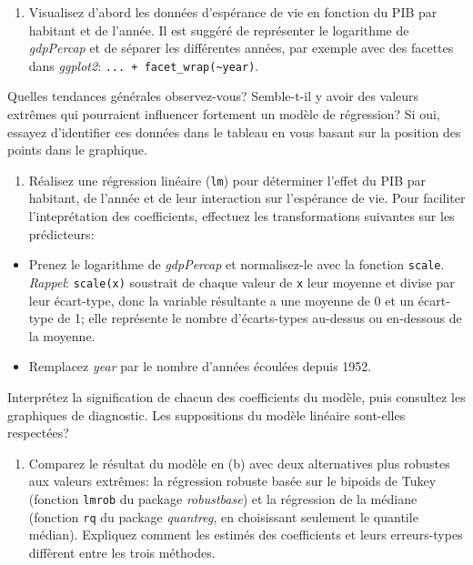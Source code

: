 \documentclass[
]{article}
\providecommand{\tightlist}{%
  \setlength{\itemsep}{0pt}\setlength{\parskip}{0pt}}
\begin{document}
\begin{enumerate}
\def\labelenumi{\alph{enumi})}
\tightlist
\item
  Visualisez d'abord les données d'espérance de vie en fonction du PIB
  par habitant et de l'année. Il est suggéré de représenter le
  logarithme de \emph{gdpPercap} et de séparer les différentes années,
  par exemple avec des facettes dans \emph{ggplot2}:
  \texttt{...\ +\ facet\_wrap(\textasciitilde{}year)}.
\end{enumerate}

Quelles tendances générales observez-vous? Semble-t-il y avoir des
valeurs extrêmes qui pourraient influencer fortement un modèle de
régression? Si oui, essayez d'identifier ces données dans le tableau en
vous basant sur la position des points dans le graphique.

\begin{enumerate}
\def\labelenumi{\alph{enumi})}
\setcounter{enumi}{1}
\tightlist
\item
  Réalisez une régression linéaire (\texttt{lm}) pour déterminer l'effet
  du PIB par habitant, de l'année et de leur interaction sur l'espérance
  de vie. Pour faciliter l'inteprétation des coefficients, effectuez les
  transformations suivantes sur les prédicteurs:
\end{enumerate}

\begin{itemize}
\item
  Prenez le logarithme de \emph{gdpPercap} et normalisez-le avec la
  fonction \texttt{scale}. \emph{Rappel}: \texttt{scale(x)} soustrait de
  chaque valeur de \texttt{x} leur moyenne et divise par leur
  écart-type, donc la variable résultante a une moyenne de 0 et un
  écart-type de 1; elle représente le nombre d'écarts-types au-dessus ou
  en-dessous de la moyenne.
\item
  Remplacez \emph{year} par le nombre d'années écoulées depuis 1952.
\end{itemize}

Interprétez la signification de chacun des coefficients du modèle, puis
consultez les graphiques de diagnostic. Les suppositions du modèle
linéaire sont-elles respectées?

\begin{enumerate}
\def\labelenumi{\alph{enumi})}
\setcounter{enumi}{2}
\tightlist
\item
  Comparez le résultat du modèle en (b) avec deux alternatives plus
  robustes aux valeurs extrêmes: la régression robuste basée sur le
  bipoids de Tukey (fonction \texttt{lmrob} du package
  \emph{robustbase}) et la régression de la médiane (fonction
  \texttt{rq} du package \emph{quantreg}, en choisissant seulement le
  quantile médian). Expliquez comment les estimés des coefficients et
  leurs erreurs-types diffèrent entre les trois méthodes.
\end{enumerate}
\end{document}
